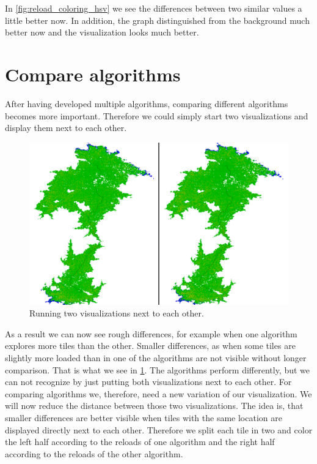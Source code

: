 \documentclass
[
	paper = a4,
    pagesize,
	12 pt,
	oneside,                       %
    open = right,
	DIV = calc,
	BCOR = 0 mm,                   %
	bibtotoc
]
{scrbook}
\begin{document}
In \cref{fig:reload_coloring_hsv} we see the differences between two similar values a little better now.
In addition, the graph distinguished from the background much better now and the visualization looks much better.

\section{Compare algorithms}

After having developed multiple algorithms, comparing different algorithms becomes more important.
Therefore we could simply start two visualizations and display them next to each other.

\begin{figure}[H]
    \includegraphics[width=\textwidth]{Images/vis-compare-two.png}
\caption[]{Running two visualizations next to each other.}
\label{fig:two_visualization}
\end{figure}


As a result we can now see rough differences, for example when one algorithm explores more tiles than the other.
Smaller differences, as when some tiles are slightly more loaded than in one of the algorithms are not visible without longer comparison.
That is what we see in \cref{fig:two_visualization}.
The algorithms perform differently, but we can not recognize by just putting both visualizations next to each other.
For comparing algorithms we, therefore, need a new variation of our visualization.
We will now reduce the distance between those two visualizations.
The idea is, that smaller differences are better visible when tiles with the same location are displayed directly next to each other.
Therefore we split each tile in two and color the left half according to the reloads of one algorithm and the right half according to the reloads of the other algorithm.
\end{document}
